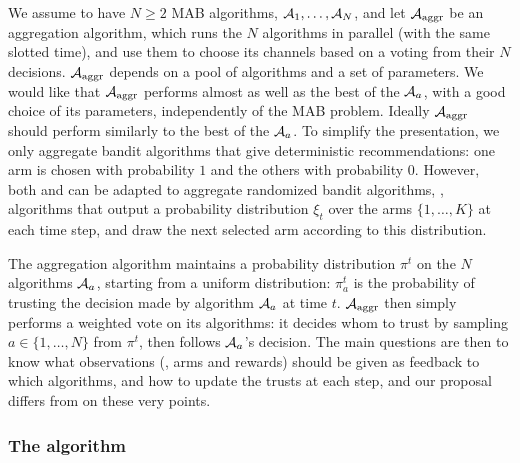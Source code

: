 We assume to have $N \geq 2$ MAB algorithms, $\mathcal{A}_1, \dots, \mathcal{A}_N$,
and let $\mathcal{A}_{\mathrm{aggr}}$ be an aggregation algorithm,
which runs the $N$ algorithms in parallel (with the same slotted time), and use them to choose its channels based on a voting from their $N$ decisions.
%
$\mathcal{A}_{\mathrm{aggr}}$ depends on a pool of algorithms and a set of parameters.
We would like that $\mathcal{A}_{\mathrm{aggr}}$
performs almost as well as the best of the $\mathcal{A}_a$, with a good choice of its parameters, independently of the MAB problem.
Ideally $\mathcal{A}_{\mathrm{aggr}}$ should perform similarly to the best of the $\mathcal{A}_a$.
%
To simplify the presentation, we only aggregate bandit algorithms that give deterministic recommendations:
one arm is chosen with probability $1$ and the others with probability $0$.
However, both \ExpQ{} and \Aggr{} can be adapted to aggregate randomized bandit algorithms, \ie, algorithms that output a probability distribution $\xi_t$ over the arms $\{1,\dots,K\}$ at each time step, and draw the next selected arm according to this distribution.

The aggregation algorithm maintains a probability distribution $\pi^{t}$ on the $N$ algorithms $\mathcal{A}_a$, starting from a uniform distribution:
$\pi^t_a$ is the probability of trusting the decision made by algorithm $\mathcal{A}_a$ at time $t$.
$\mathcal{A}_{\mathrm{aggr}}$ then simply performs a weighted vote on its algorithms: it decides whom to trust by sampling $a \in \{1,\dots,N\}$ from $\pi^t$, then follows $\mathcal{A}_a$'s decision.
The main questions are then to know what observations (\ie, arms and rewards) should be given as feedback to which algorithms,
and how to update the trusts at each step, and our proposal \Aggr{} differs from \ExpQ{} on these very points.


\subsubsection{The \Aggr{} algorithm}\label{sub:25:Aggr}

